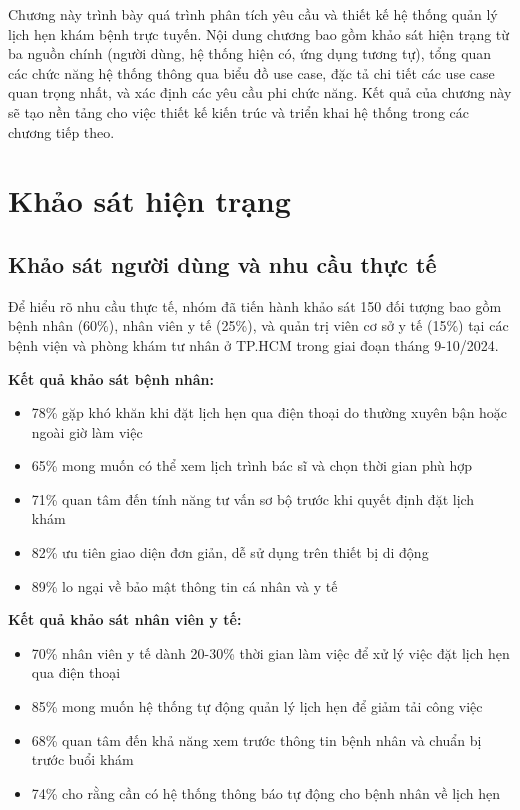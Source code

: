 \documentclass[../DoAn.tex]{subfiles}
\begin{document}
Chương này trình bày quá trình phân tích yêu cầu và thiết kế hệ thống quản lý lịch hẹn khám bệnh trực tuyến. Nội dung chương bao gồm khảo sát hiện trạng từ ba nguồn chính (người dùng, hệ thống hiện có, ứng dụng tương tự), tổng quan các chức năng hệ thống thông qua biểu đồ use case, đặc tả chi tiết các use case quan trọng nhất, và xác định các yêu cầu phi chức năng. Kết quả của chương này sẽ tạo nền tảng cho việc thiết kế kiến trúc và triển khai hệ thống trong các chương tiếp theo.

\section{Khảo sát hiện trạng}
\label{section:2.1}

\subsection{Khảo sát người dùng và nhu cầu thực tế}

Để hiểu rõ nhu cầu thực tế, nhóm đã tiến hành khảo sát 150 đối tượng bao gồm bệnh nhân (60\%), nhân viên y tế (25\%), và quản trị viên cơ sở y tế (15\%) tại các bệnh viện và phòng khám tư nhân ở TP.HCM trong giai đoạn tháng 9-10/2024.

\textbf{Kết quả khảo sát bệnh nhân:}
\begin{itemize}
    \item 78\% gặp khó khăn khi đặt lịch hẹn qua điện thoại do thường xuyên bận hoặc ngoài giờ làm việc
    \item 65\% mong muốn có thể xem lịch trình bác sĩ và chọn thời gian phù hợp
    \item 71\% quan tâm đến tính năng tư vấn sơ bộ trước khi quyết định đặt lịch khám
    \item 82\% ưu tiên giao diện đơn giản, dễ sử dụng trên thiết bị di động
    \item 89\% lo ngại về bảo mật thông tin cá nhân và y tế
\end{itemize}

\textbf{Kết quả khảo sát nhân viên y tế:}
\begin{itemize}
    \item 70\% nhân viên y tế dành 20-30\% thời gian làm việc để xử lý việc đặt lịch hẹn qua điện thoại
    \item 85\% mong muốn hệ thống tự động quản lý lịch hẹn để giảm tải công việc
    \item 68\% quan tâm đến khả năng xem trước thông tin bệnh nhân và chuẩn bị trước buổi khám
    \item 74\% cho rằng cần có hệ thống thông báo tự động cho bệnh nhân về lịch hẹn
\end{itemize}
\end{document}
